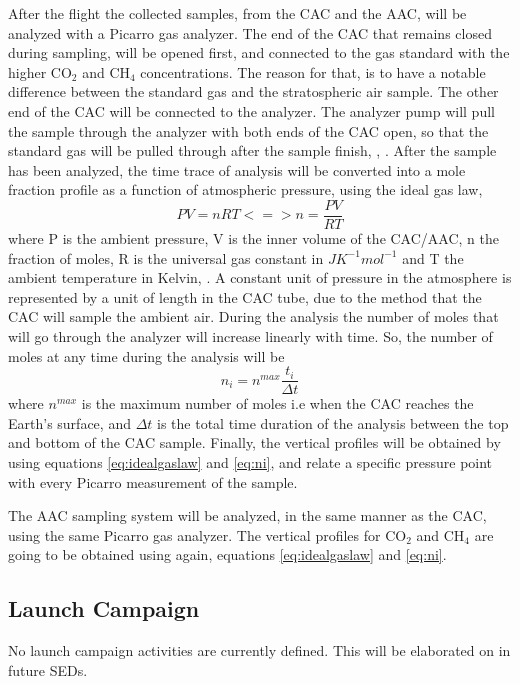 \documentclass[a4paper,12pt,twoside]{article}
\begin{document}
After the flight the collected samples, from the CAC and the AAC, will be analyzed with a Picarro gas analyzer. The end of the CAC that remains closed during sampling, will be opened first, and connected to the gas standard with the higher CO$_2$ and CH$_4$ concentrations. The reason for that, is to have a notable difference between the standard gas and the stratospheric air sample. The other end of the CAC will be connected to the analyzer. The analyzer pump will pull the sample through the analyzer with both ends of the CAC open, so that the standard gas will be pulled through after the sample finish, \cite{Karion}, \cite{Olivier}.
After the sample has been analyzed, the time trace of analysis will be converted into a mole fraction profile as a function of atmospheric pressure, using the ideal gas law,
\begin{equation}
    PV = nRT <=> n = \frac{PV}{RT}
    \label{eq:idealgaslaw}
\end{equation}
where P is the ambient pressure, V is the inner volume of the CAC/AAC, n the fraction of moles, R is the universal gas constant in $J K^{-1} mol^{-1}$ and T the ambient temperature in Kelvin, \cite{Olivier}. 
A constant unit of pressure in the atmosphere is represented by a unit of length in the CAC tube, due to the method that the CAC will sample the ambient air.
During the analysis the number of moles that will go through the analyzer will increase linearly with time. So, the number of moles at any time during the analysis will be
\begin{equation}
    n_i = n^{max}\frac{t_i}{\Delta t}
    \label{eq:ni}
\end{equation}
where $n^{max}$ is the maximum number of moles i.e when the CAC reaches the Earth's surface, and $\Delta t$  is the total time duration of the analysis between the top and bottom of the CAC sample.   
Finally, the vertical profiles will be obtained by using equations \ref{eq:idealgaslaw} and \ref{eq:ni}, and relate a specific pressure point with every Picarro measurement of the sample.   

The AAC sampling system will be analyzed, in the same manner as the CAC, using the same Picarro gas analyzer. The vertical profiles for CO$_2$ and CH$_4$ are going to be obtained using again, equations \ref{eq:idealgaslaw} and \ref{eq:ni}. 


 
\pagebreak
\subsection{Launch Campaign}
No launch campaign activities are currently defined. This will be elaborated on in future SEDs.
\end{document}
